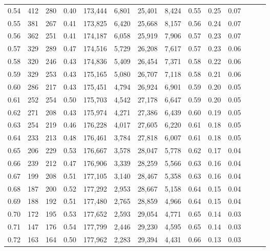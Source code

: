 \begin{tabular}{rrrrrrrrrrrrrr}
0.54 &     412 &  280 &  0.40 &  173,444 &    6,801 &  25,401 &   8,424 &  0.55 &  0.25 &      0.07 \\
0.55 &     381 &  267 &  0.41 &  173,825 &    6,420 &  25,668 &   8,157 &  0.56 &  0.24 &      0.07 \\
0.56 &     362 &  251 &  0.41 &  174,187 &    6,058 &  25,919 &   7,906 &  0.57 &  0.23 &      0.07 \\
0.57 &     329 &  289 &  0.47 &  174,516 &    5,729 &  26,208 &   7,617 &  0.57 &  0.23 &      0.06 \\
0.58 &     320 &  246 &  0.43 &  174,836 &    5,409 &  26,454 &   7,371 &  0.58 &  0.22 &      0.06 \\
0.59 &     329 &  253 &  0.43 &  175,165 &    5,080 &  26,707 &   7,118 &  0.58 &  0.21 &      0.06 \\
0.60 &     286 &  217 &  0.43 &  175,451 &    4,794 &  26,924 &   6,901 &  0.59 &  0.20 &      0.05 \\
0.61 &     252 &  254 &  0.50 &  175,703 &    4,542 &  27,178 &   6,647 &  0.59 &  0.20 &      0.05 \\
0.62 &     271 &  208 &  0.43 &  175,974 &    4,271 &  27,386 &   6,439 &  0.60 &  0.19 &      0.05 \\
0.63 &     254 &  219 &  0.46 &  176,228 &    4,017 &  27,605 &   6,220 &  0.61 &  0.18 &      0.05 \\
0.64 &     233 &  213 &  0.48 &  176,461 &    3,784 &  27,818 &   6,007 &  0.61 &  0.18 &      0.05 \\
0.65 &     206 &  229 &  0.53 &  176,667 &    3,578 &  28,047 &   5,778 &  0.62 &  0.17 &      0.04 \\
0.66 &     239 &  212 &  0.47 &  176,906 &    3,339 &  28,259 &   5,566 &  0.63 &  0.16 &      0.04 \\
0.67 &     199 &  208 &  0.51 &  177,105 &    3,140 &  28,467 &   5,358 &  0.63 &  0.16 &      0.04 \\
0.68 &     187 &  200 &  0.52 &  177,292 &    2,953 &  28,667 &   5,158 &  0.64 &  0.15 &      0.04 \\
0.69 &     188 &  192 &  0.51 &  177,480 &    2,765 &  28,859 &   4,966 &  0.64 &  0.15 &      0.04 \\
0.70 &     172 &  195 &  0.53 &  177,652 &    2,593 &  29,054 &   4,771 &  0.65 &  0.14 &      0.03 \\
0.71 &     147 &  176 &  0.54 &  177,799 &    2,446 &  29,230 &   4,595 &  0.65 &  0.14 &      0.03 \\
0.72 &     163 &  164 &  0.50 &  177,962 &    2,283 &  29,394 &   4,431 &  0.66 &  0.13 &      0.03 \\

\end{tabular}
